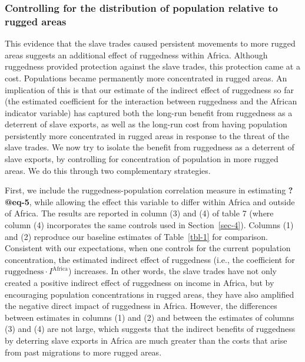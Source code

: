 \documentclass[
  letterpaper,
  DIV=11,
  numbers=noendperiod]{scrartcl}
\begin{document}
\subsubsection{Controlling for the distribution of population relative
to rugged
areas}\label{controlling-for-the-distribution-of-population-relative-to-rugged-areas}

This evidence that the slave trades caused persistent movements to more
rugged areas suggests an additional effect of ruggedness within Africa.
Although ruggedness provided protection against the slave trades, this
protection came at a cost. Populations became permanently more
concentrated in rugged areas. An implication of this is that our
estimate of the indirect effect of ruggedness so far (the estimated
coefficient for the interaction between ruggedness and the African
indicator variable) has captured both the long-run benefit from
ruggedness as a deterrent of slave exports, as well as the long-run cost
from having population persistently more concentrated in rugged areas in
response to the threat of the slave trades. We now try to isolate the
benefit from ruggedness as a deterrent of slave exports, by controlling
for concentration of population in more rugged areas. We do this through
two complementary strategies.

First, we include the ruggedness-population correlation measure in
estimating \textbf{?@eq-5}, while allowing the effect this variable to
differ within Africa and outside of Africa. The results are reported in
column (3) and (4) of table 7 (where column (4) incorporates the same
controls used in Section~\ref{sec-4}). Columns (1) and (2) reproduce our
baseline estimates of Table~\ref{tbl-1} for comparison. Consistent with
our expectations, when one controls for the current population
concentration, the estimated indirect effect of ruggedness (i.e., the
coefficient for \(\text{ruggedness}\cdot I^\text{Africa}\)) increases.
In other words, the slave trades have not only created a positive
indirect effect of ruggedness on income in Africa, but by encouraging
population concentrations in rugged areas, they have also amplified the
negative direct impact of ruggedness in Africa. However, the differences
between estimates in columns (1) and (2) and between the estimates of
columns (3) and (4) are not large, which suggests that the indirect
benefits of ruggedness by deterring slave exports in Africa are much
greater than the costs that arise from past migrations to more rugged
areas.
\end{document}
